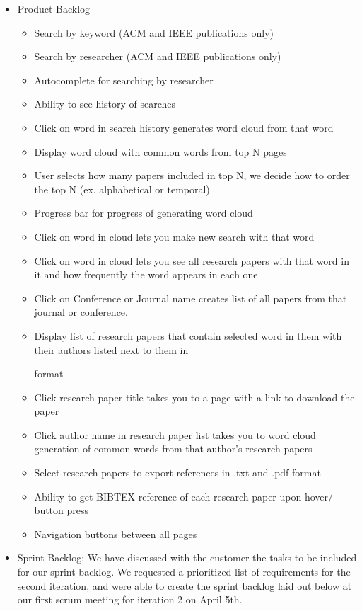 \documentclass[]{article}
\begin{document}
\begin{itemize}
\itemsep1pt\parskip0pt
\item
  Product Backlog

  \begin{itemize}
  \itemsep1pt\parskip0pt
  \item
    Search by keyword (ACM and IEEE publications only)
  \item
    Search by researcher (ACM and IEEE publications only)
  \item
    Autocomplete for searching by researcher
  \item
    Ability to see history of searches
  \item
    Click on word in search history generates word cloud from that word
  \item
    Display word cloud with common words from top N pages
  \item
    User selects how many papers included in top N, we decide how to
    order the top N (ex. alphabetical or temporal)
  \item
    Progress bar for progress of generating word cloud
  \item
    Click on word in cloud lets you make new search with that word
  \item
    Click on word in cloud lets you see all research papers with that
    word in it and how frequently the word appears in each one
  \item
    Click on Conference or Journal name creates list of all papers from
    that journal or conference.
  \item
    Display list of research papers that contain selected word in them
    with their authors listed next to them in

    format
  \item
    Click research paper title takes you to a page with a link to
    download the paper
  \item
    Click author name in research paper list takes you to word cloud
    generation of common words from that author's research papers
  \item
    Select research papers to export references in .txt and .pdf format
  \item
    Ability to get BIBTEX reference of each research paper upon hover/
    button press
  \item
    Navigation buttons between all pages
  \end{itemize}
\item
  Sprint Backlog: We have discussed with the customer the tasks to be
  included for our sprint backlog. We requested a prioritized list of
  requirements for the second iteration, and were able to create the
  sprint backlog laid out below at our first scrum meeting for iteration
  2 on April 5th.


\end{itemize}
\end{document}
